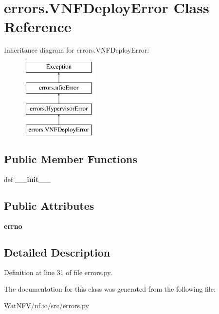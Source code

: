 \hypertarget{classerrors_1_1VNFDeployError}{\section{errors.\-V\-N\-F\-Deploy\-Error Class Reference}
\label{classerrors_1_1VNFDeployError}
}
Inheritance diagram for errors.\-V\-N\-F\-Deploy\-Error\-:\begin{figure}[H]
\begin{center}
\leavevmode
\includegraphics[height=4.000000cm]{classerrors_1_1VNFDeployError}
\end{center}
\end{figure}
\subsection*{Public Member Functions}
\begin{DoxyCompactItemize}
\item 
\hypertarget{classerrors_1_1VNFDeployError_a0c9aa66d6c3ea4936ee8395f04704a49}{def {\bfseries \-\_\-\-\_\-init\-\_\-\-\_\-}}\label{classerrors_1_1VNFDeployError_a0c9aa66d6c3ea4936ee8395f04704a49}

\end{DoxyCompactItemize}
\subsection*{Public Attributes}
\begin{DoxyCompactItemize}
\item 
\hypertarget{classerrors_1_1VNFDeployError_ad0add55d5e569b624981a36ada90804b}{{\bfseries errno}}\label{classerrors_1_1VNFDeployError_ad0add55d5e569b624981a36ada90804b}

\end{DoxyCompactItemize}


\subsection{Detailed Description}


Definition at line 31 of file errors.\-py.



The documentation for this class was generated from the following file\-:\begin{DoxyCompactItemize}
\item 
Wat\-N\-F\-V/nf.\-io/src/errors.\-py\end{DoxyCompactItemize}
